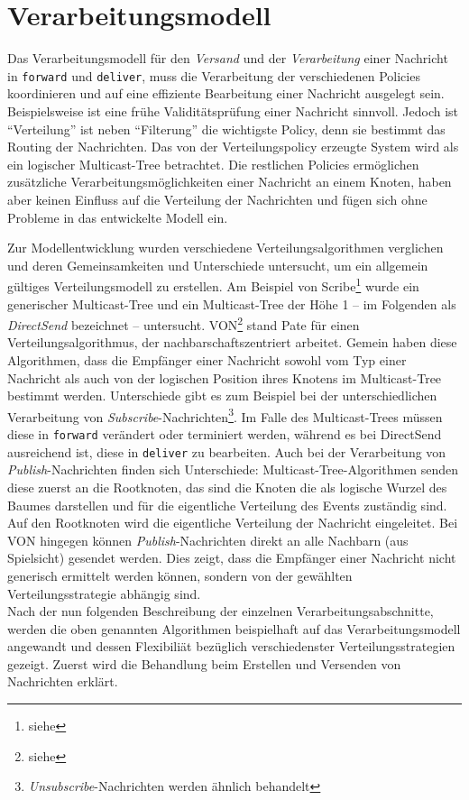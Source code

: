 \section{Verarbeitungsmodell}
Das Verarbeitungsmodell für den \emph{Versand} und der \emph{Verarbeitung} einer Nachricht in \texttt{forward} und \texttt{deliver}, muss die Verarbeitung der verschiedenen Policies koordinieren und auf eine effiziente Bearbeitung einer Nachricht ausgelegt sein. Beispielsweise ist eine frühe Validitätsprüfung einer Nachricht sinnvoll. Jedoch ist \enquote{Verteilung} ist neben \enquote{Filterung} die wichtigste Policy, denn sie bestimmt das Routing der Nachrichten. Das von der Verteilungspolicy erzeugte System wird als ein logischer Multicast-Tree betrachtet. Die restlichen Policies ermöglichen zusätzliche Verarbeitungsmöglichkeiten einer Nachricht an einem Knoten, haben aber keinen Einfluss auf die Verteilung der Nachrichten und fügen sich ohne Probleme in das entwickelte Modell ein. 

Zur Modellentwicklung wurden verschiedene Verteilungsalgorithmen verglichen und deren Gemeinsamkeiten und Unterschiede untersucht, um ein allgemein gültiges Verteilungsmodell zu erstellen. Am Beispiel von Scribe\footnote{siehe } wurde ein generischer Multicast-Tree und ein Multicast-Tree der Höhe 1 -- im Folgenden als \emph{DirectSend} bezeichnet -- untersucht. VON\footnote{siehe } stand Pate für einen Verteilungsalgorithmus, der nachbarschaftszentriert arbeitet. Gemein haben diese Algorithmen, dass die Empfänger einer Nachricht sowohl vom Typ einer Nachricht als auch von der logischen Position ihres Knotens im Multicast-Tree bestimmt werden. Unterschiede gibt es zum Beispiel bei der unterschiedlichen Verarbeitung von \emph{Subscribe}-Nachrichten\footnote{\emph{Unsubscribe}-Nachrichten werden ähnlich behandelt}. Im Falle des Multicast-Trees müssen diese in \texttt{forward} verändert oder terminiert werden, während es bei DirectSend ausreichend ist, diese in \texttt{deliver} zu bearbeiten. Auch bei der Verarbeitung von \emph{Publish}-Nachrichten finden sich Unterschiede: Multicast-Tree-Algorithmen senden diese zuerst an die Rootknoten, das sind die Knoten die als logische Wurzel des Baumes darstellen und für die eigentliche Verteilung des Events zuständig sind. Auf den Rootknoten wird die eigentliche Verteilung der Nachricht eingeleitet. Bei VON hingegen können \emph{Publish}-Nachrichten direkt an alle Nachbarn (aus Spielsicht) gesendet werden. Dies zeigt, dass die Empfänger einer Nachricht nicht generisch ermittelt werden können, sondern von der gewählten Verteilungsstrategie abhängig sind.\\
Nach der nun folgenden Beschreibung der einzelnen Verarbeitungsabschnitte, werden die oben genannten Algorithmen beispielhaft auf das Verarbeitungsmodell angewandt und dessen Flexibiliät bezüglich verschiedenster Verteilungsstrategien gezeigt. Zuerst wird die Behandlung beim Erstellen und Versenden von Nachrichten erklärt.

